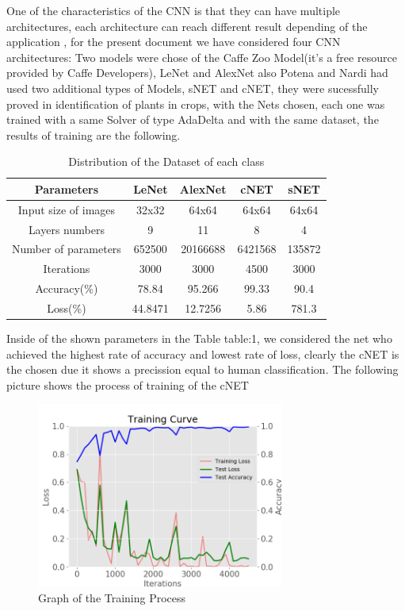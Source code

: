\documentclass[conference]{IEEEtran}
\begin{document}
One of the characteristics of the CNN is that they can have multiple architectures, each architecture can reach different result depending of the application , for the present document we have considered four CNN architectures: Two models were chose of the Caffe Zoo Model(it's a free resource provided by Caffe Developers), LeNet and AlexNet also Potena and Nardi had used two additional types of Models, sNET and cNET, they were sucessfully proved in identification of plants in crops\cite{Potena:Nardi}, with the Nets chosen, each one was trained with a same Solver of type AdaDelta and with the same dataset, the results of training are the following. 
\\
\begin{table}[h!]
\centering
\begin{tabular}{||c c c c c||} 
 \hline
 Parameters & LeNet & AlexNet & cNET & sNET \\ [0.5ex] 
 \hline\hline
 Input size of images & 32x32 & 64x64 & 64x64 & 64x64 \\ 
 Layers numbers & 9 & 11 & 8 & 4\\
 Number of parameters & 652500 & 20166688 & 6421568 & 135872 \\ 
 Iterations & 3000 & 3000 & 4500 & 3000 \\ 
  Accuracy(\%) & 78.84 & 95.266 & 99.33 & 90.4 \\
  Loss(\%) & 44.8471 & 12.7256 & 5.86 & 781.3 \\ [1ex] 
 \hline
\end{tabular}
\caption{Distribution of the Dataset of each class}
\label{table:1}
\end{table}
	
Inside of the shown parameters in the Table {table:1}, we considered the net who achieved the highest rate of accuracy and lowest rate of loss, clearly the cNET is the chosen due it shows a precission equal to human classification. The following picture shows the process of training of the cNET \\

	\begin{figure}[h]
	\centering
	\includegraphics[width=3.2in]{entrenamiento}
	\caption{ Graph of the Training Process }
	\label{fig_sim}
	\end{figure}
\end{document}
